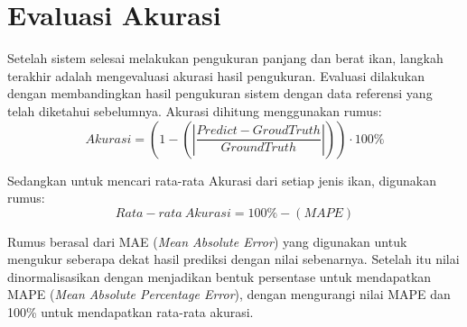 
\section{Evaluasi Akurasi}
    Setelah sistem selesai melakukan pengukuran panjang dan berat ikan, langkah terakhir adalah mengevaluasi akurasi hasil pengukuran. Evaluasi dilakukan dengan membandingkan hasil pengukuran sistem dengan data referensi yang telah diketahui sebelumnya. 
    Akurasi dihitung menggunakan rumus:
\begin{equation}
    Akurasi = (1 - (|\frac{Predict - GroudTruth}{GroundTruth}|)) \cdot 100\%
\end{equation}

    Sedangkan untuk mencari rata-rata Akurasi dari setiap jenis ikan, digunakan rumus:
\begin{equation}
    Rata-rata\ Akurasi = 100\% - (MAPE)
\end{equation}

    Rumus berasal dari MAE (\emph{Mean Absolute Error}) yang digunakan untuk mengukur seberapa dekat hasil prediksi dengan nilai sebenarnya.
Setelah itu nilai dinormalisasikan dengan menjadikan bentuk persentase untuk mendapatkan MAPE (\emph{Mean Absolute Percentage Error}), dengan mengurangi nilai MAPE dan 100\% untuk mendapatkan rata-rata akurasi. 
 
